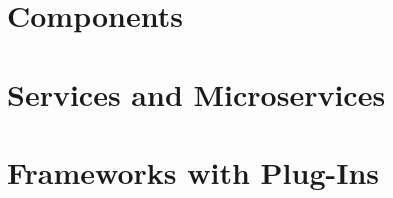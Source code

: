 \documentclass[
	aspectratio=169, %
	8pt, %
	handout, %
]{beamer}
\subtitle{6. Modular Features}
\author{Timo Kehrer, Thomas Thüm, Elias Kuiter}
\begin{document}


\section{Components}



\lessonslearned{
	\item \ldots
}{
	\item \ldots
}{
	\ldots
}

\sectionend

\section{Services and Microservices}



\lessonslearned{
	\item \ldots
}{
	\item \ldots
}{
	\ldots
}

\sectionend

\section{Frameworks with Plug-Ins}



\lessonslearned{
	\item \ldots
}{
	\item \ldots
}{
	\ldots
}


\end{document}
